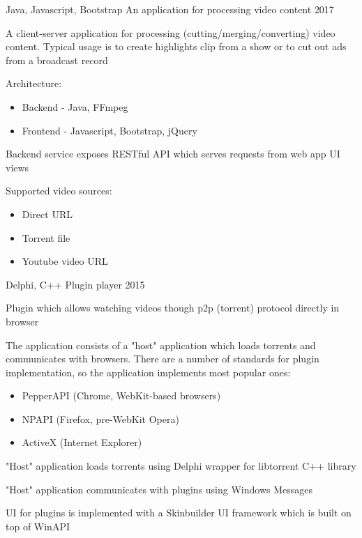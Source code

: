 \begin{cventries}
  \cventry
    {Java, Javascript, Bootstrap}
    {An application for processing video content}
    {}
    {2017}
    {
      \begin{cvitems} %
      	\item A client-server application for processing (cutting/merging/converting) video content. Typical usage is to create highlights clip from a show or to cut out ads from a broadcast record
        \item Architecture:
          \begin{itemize}
              \item Backend - Java, FFmpeg
              \item Frontend - Javascript, Bootstrap, jQuery
          \end{itemize}
		\item Backend service exposes RESTful API which serves requests from web app UI views
        \item Supported video sources:
          \begin{itemize}
              \item Direct URL
              \item Torrent file
              \item Youtube video URL
          \end{itemize}
      \end{cvitems}
    }
    
  \cventry
    {Delphi, C++}
    {Plugin player}
    {}
    {2015}
    {
      \begin{cvitems} %
      	\item Plugin which allows watching videos though p2p (torrent) protocol directly in browser
        \item The application consists of a "host" application which loads torrents and communicates with browsers. There are a number of standards for plugin implementation, so the application implements most popular ones:
          \begin{itemize}
              \item PepperAPI (Chrome, WebKit-based browsers)
              \item NPAPI (Firefox, pre-WebKit Opera)
              \item ActiveX (Internet Explorer)
          \end{itemize}
        \item "Host" application loads torrents using Delphi wrapper for libtorrent C++ library
        \item "Host" application communicates with plugins using Windows Messages
        \item UI for plugins is implemented with a Skinbuilder UI framework which is built on top of WinAPI
      \end{cvitems}
    }
    
    
\end{cventries}
